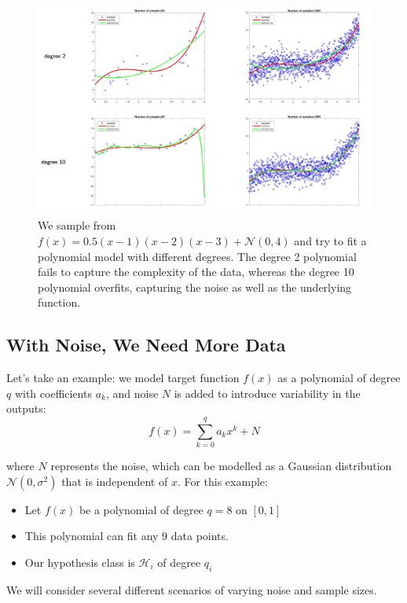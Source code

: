 \begin{figure}[H]
    \centering
    \includegraphics[width=1\linewidth]{img/deg2-10-example.png}
    \caption{We sample from $f(x) = 0.5(x-1)(x-2)(x-3) + \mathcal{N}(0,4)$ and try to fit a polynomial model with different degrees. The degree 2 polynomial fails to capture the complexity of the data, whereas the degree 10 polynomial overfits, capturing the noise as well as the underlying function.}
    
    
\end{figure}


\subsection{With Noise, We Need More Data}
Let's take an example: we model target function \( f(x) \) as a polynomial of degree \( q \) with coefficients \( a_k \), and noise \( N \) is added to introduce variability in the outputs:
\[
    f(x) = \sum_{k=0}^{q} a_k x^k + N
\]

where \( N \) represents the noise, which can be modelled as a Gaussian distribution \( \mathcal{N}(0, \sigma^2) \) that is independent of \( x \). For this example: 

\begin{itemize}
    \item Let $f(x)$ be a polynomial of degree $q=8$ on $[0,1]$
    \item This polynomial can fit any 9 data points.
    \item Our hypothesis class is $\mathcal{H}_i$ of degree $q_i$
\end{itemize} 

We will consider several different scenarios of varying noise and sample sizes.\\ 


